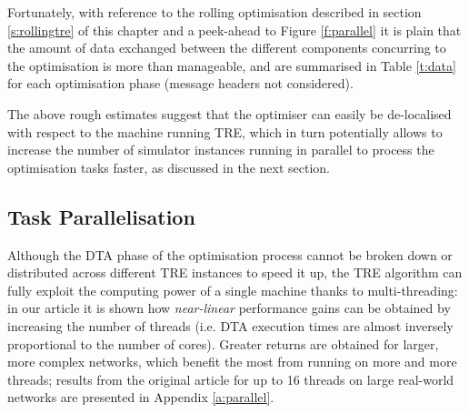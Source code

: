 Fortunately, with reference to the rolling optimisation described in section \ref{s:rollingtre} of this chapter and a peek-ahead to Figure \ref{f:parallel} it is plain that the amount of data exchanged between the different components concurring to the optimisation is more than manageable, and are summarised in Table \ref{t:data} for each optimisation phase (message headers not considered).


The above rough estimates suggest that the optimiser can easily be de-localised with respect to the machine running TRE, which in turn potentially allows to increase the number of simulator instances running in parallel to process the optimisation tasks faster, as discussed in the next section.

\subsection{Task Parallelisation} \label{s:parallel}
Although the DTA phase of the optimisation process cannot be broken down or distributed across different TRE instances to speed it up, the TRE algorithm can fully exploit the computing power of a single machine thanks to multi-threading: in our article \citep{attanasi2015real} it is shown how \emph{near-linear} performance gains can be obtained by increasing the number of threads (i.e. DTA execution times are almost inversely proportional to the number of cores). Greater returns are obtained for larger, more complex networks, which benefit the most from running on more and more threads; results from the original article for up to 16 threads on large real-world networks are presented in Appendix \ref{a:parallel}.


